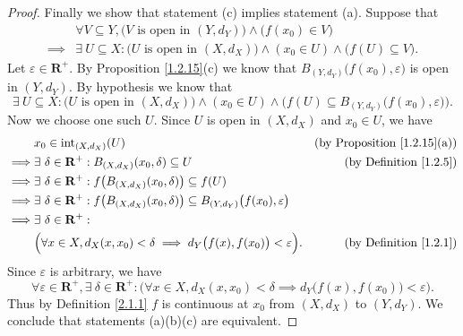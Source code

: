 \begin{proof}
    Finally we show that statement (c) implies statement (a).
    Suppose that
    \begin{align*}
                 & \forall V \subseteq Y, \big(V \text{ is open in } (Y, d_Y)\big) \land \big(f(x_0) \in V\big)                          \\
        \implies & \exists\ U \subseteq X : \big(U \text{ is open in } (X, d_X)\big) \land (x_0 \in U) \land \big(f(U) \subseteq V\big).
    \end{align*}
    Let \(\varepsilon \in \mathbf{R}^+\).
    By Proposition \ref{1.2.15}(c) we know that \(B_{(Y, d_Y)}\big(f(x_0), \varepsilon\big)\) is open in \((Y, d_Y)\).
    By hypothesis we know that
    \[
        \exists\ U \subseteq X : \big(U \text{ is open in } (X, d_X)\big) \land (x_0 \in U) \land \Big(f(U) \subseteq B_{(Y, d_Y)}\big(f(x_0), \varepsilon\big)\Big).
    \]
    Now we choose one such \(U\).
    Since \(U\) is open in \((X, d_X)\) and \(x_0 \in U\), we have
    \begin{align*}
                 & x_0 \in \text{int}_{(X, d_X)}(U)                                                                                            & \text{(by Proposition \ref{1.2.15}(a))} \\
        \implies & \exists\ \delta \in \mathbf{R}^+ : B_{(X, d_X)}(x_0, \delta) \subseteq U                                                    & \text{(by Definition \ref{1.2.5})}      \\
        \implies & \exists\ \delta \in \mathbf{R}^+ : f\big(B_{(X, d_X)}(x_0, \delta)\big) \subseteq f(U)                                                                                \\
        \implies & \exists\ \delta \in \mathbf{R}^+ : f\big(B_{(X, d_X)}(x_0, \delta)\big) \subseteq B_{(Y, d_Y)}\big(f(x_0), \varepsilon\big)                                           \\
        \implies & \exists\ \delta \in \mathbf{R}^+ :                                                                                                                                    \\
                 & \Big(\forall x \in X, d_X(x, x_0) < \delta \implies d_Y\big(f(x), f(x_0)\big) < \varepsilon\Big).                           & \text{(by Definition \ref{1.2.1})}
    \end{align*}
    Since \(\varepsilon\) is arbitrary, we have
    \[
        \forall \varepsilon \in \mathbf{R}^+, \exists\ \delta \in \mathbf{R}^+ : \Big(\forall x \in X, d_X(x, x_0) < \delta \implies d_Y\big(f(x), f(x_0)\big) < \varepsilon\Big).
    \]
    Thus by Definition \ref{2.1.1} \(f\) is continuous at \(x_0\) from \((X, d_X)\) to \((Y, d_Y)\).
    We conclude that statements (a)(b)(c) are equivalent.
\end{proof}

